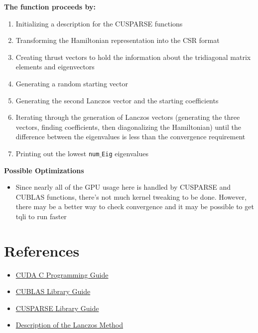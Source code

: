 \documentclass{article}
\begin{document}
\noindent\textbf{The function proceeds by:}
\begin{enumerate}
\item{Initializing a description for the CUSPARSE functions}
\item{Transforming the Hamiltonian representation into the CSR format}
\item{Creating thrust vectors to hold the information about the tridiagonal matrix elements and eigenvectors}
\item{Generating a random starting vector}
\item{Generating the second Lanczos vector and the starting coefficients}
\item{Iterating through the generation of Lanczos vectors (generating the three vectors, finding coefficients, then diagonalizing the Hamiltonian) until the difference between the eigenvalues is less than the convergence requirement}
\item{Printing out the lowest \texttt{num$\_$Eig} eigenvalues}
\end{enumerate}

\noindent\textbf{Possible Optimizations}
\begin{itemize}
\item{Since nearly all of the GPU usage here is handled by CUSPARSE and CUBLAS functions, there's not much kernel tweaking to be done. However, there may be a better way to check convergence and it may be possible to get tqli to run faster}
\end{itemize}

\section{References}
\begin{itemize}
\item{\href{http://developer.download.nvidia.com/compute/DevZone/docs/html/C/doc/CUDA_C_Programming_Guide.pdf}{CUDA C Programming Guide}}
\item{\href{http://developer.download.nvidia.com/compute/DevZone/docs/html/CUDALibraries/doc/CUBLAS_Library.pdf}{CUBLAS Library Guide}}
\item{\href{http://developer.download.nvidia.com/compute/DevZone/docs/html/CUDALibraries/doc/CUSPARSE_Library.pdf}{CUSPARSE Library Guide}}
\item{\href{http://arxiv.org/pdf/1101.3281}{Description of the Lanczos Method}}
\end{itemize}
\end{document}
